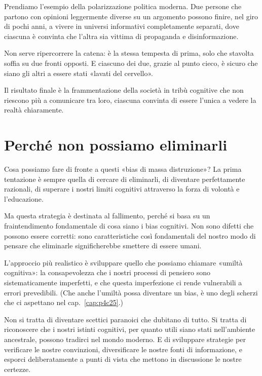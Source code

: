 Prendiamo l'esempio della polarizzazione politica moderna. Due persone che partono con opinioni leggermente diverse su un argomento possono finire, nel giro di pochi anni, a vivere in universi informativi completamente separati, dove ciascuna è convinta che l'altra sia vittima di propaganda e disinformazione.

Non serve ripercorrere la catena: è la stessa tempesta di prima, solo che stavolta soffia su due fronti opposti. E ciascuno dei due, grazie al punto cieco, è sicuro che siano gli altri a essere stati «lavati del cervello».

Il risultato finale è la frammentazione della società in tribù cognitive che non riescono più a comunicare tra loro, ciascuna convinta di essere l'unica a vedere la realtà chiaramente.

\bigskip

\section{Perché non possiamo eliminarli}
\label{sec:p4c8-perche-non-possiamo}
Cosa possiamo fare di fronte a questi «bias di massa distruzione»? La prima tentazione è sempre quella di cercare di eliminarli, di diventare perfettamente razionali, di superare i nostri limiti cognitivi attraverso la forza di volontà e l'educazione.

Ma questa strategia è destinata al fallimento, perché si basa su un fraintendimento fondamentale di cosa siano i bias cognitivi. Non sono difetti che possono essere corretti: sono caratteristiche così fondamentali del nostro modo di pensare che eliminarle significherebbe smettere di essere umani.

L'approccio più realistico è sviluppare quello che possiamo chiamare «umiltà cognitiva»: la consapevolezza che i nostri processi di pensiero sono sistematicamente imperfetti, e che questa imperfezione ci rende vulnerabili a errori prevedibili. (Che anche l'umiltà possa diventare un bias, è uno degli scherzi che ci aspettano nel cap.~\ref{cap:p4c25}.)

Non si tratta di diventare scettici paranoici che dubitano di tutto. Si tratta di riconoscere che i nostri istinti cognitivi, per quanto utili siano stati nell'ambiente ancestrale, possono tradirci nel mondo moderno. E di sviluppare strategie per verificare le nostre convinzioni, diversificare le nostre fonti di informazione, e esporci deliberatamente a punti di vista che mettono in discussione le nostre certezze.

